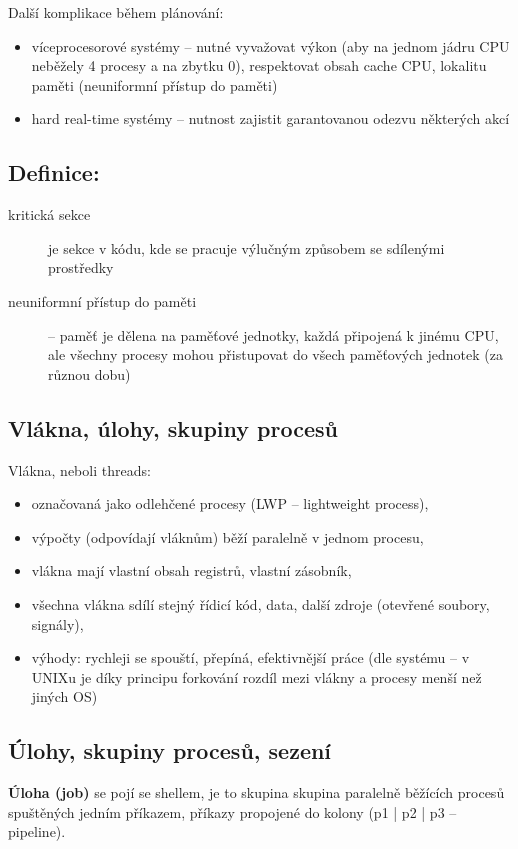 \documentclass[a4paper, 11pt]{article}
\begin{document}
Další komplikace během plánování:
\begin{itemize}
 \item víceprocesorové systémy -- nutné vyvažovat výkon (aby na jednom jádru CPU neběžely 4 procesy a na zbytku 0), respektovat obsah cache CPU, lokalitu paměti (neuniformní přístup do paměti)
 \item hard real-time systémy -- nutnost zajistit garantovanou odezvu některých akcí
\end{itemize}

\subsection*{Definice:}
\begin{description}
\item[kritická sekce] je sekce v kódu, kde se pracuje výlučným způsobem se sdílenými prostředky

\item[neuniformní přístup do paměti] -- paměť je dělena na paměťové jednotky, každá připojená k jinému CPU, ale všechny procesy mohou přistupovat do všech paměťových jednotek (za různou dobu)
\end{description}

\subsection{Vlákna, úlohy, skupiny procesů}
Vlákna, neboli threads:
\begin{itemize}
 \item označovaná jako odlehčené procesy (LWP -- lightweight process),
 \item výpočty (odpovídají vláknům) běží paralelně v jednom procesu,
 \item vlákna mají vlastní obsah registrů, vlastní zásobník,
 \item všechna vlákna sdílí stejný řídicí kód, data, další zdroje (otevřené soubory, signály),
 \item výhody: rychleji se spouští, přepíná, efektivnější práce (dle systému -- v UNIXu je díky principu forkování rozdíl mezi vlákny a procesy menší než jiných OS)
\end{itemize}

\subsection{Úlohy, skupiny procesů, sezení}
\textbf{Úloha (job)} se pojí se shellem, je to skupina skupina paralelně běžících procesů spuštěných jedním příkazem, příkazy propojené do kolony (p1 | p2 | p3 -- pipeline).
 
\end{document}
